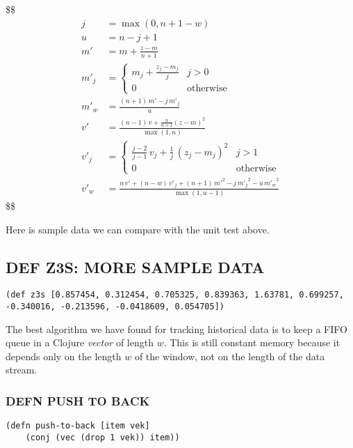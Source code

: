 \documentclass[10pt,oneside,x11names]{article}
\begin{document}
\$\$
\begin{align}
j     &= \max(0,n+1-w)               \\
u     &= n-j+1                       \\
m'    &= m+\frac{z-m}{n+1}           \\
m'_j  &= \begin{cases}
  m_j+\frac{z_j-m_j}{j} & j>0        \\
  0 & \mathrm{otherwise}
\end{cases}                          \\
m'_w  &= \frac{(n+1)\,m'-j\,m'_j}{u} \\
v'    &= \frac{(n-1)\,v+\frac{n}{n+1}\left(z-m\right)^2}{\max(1,n)}   \\
v'_j  &= \begin{cases}
  \frac{j-2}{j-1}\,v_j+\frac{1}{j}\,\left(z_j-m_j\right)^2 & j>1      \\
  0 & \mathrm{otherwise}
\end{cases}                                                           \\
v'_w  &= \frac{n\,v'+(n-w)\,v'_j+(n+1)\,{m'}^2-j\,{m'_j}^2-u\,{m'_w}^2}{\max(1,u-1)}
\end{align}
\$\$

Here is sample data we can compare with the unit test above.

\subsection{DEF Z3S: MORE SAMPLE DATA}
\label{sec:orgbf3f789}
\begin{verbatim}
(def z3s [0.857454, 0.312454, 0.705325, 0.839363, 1.63781, 0.699257, -0.340016, -0.213596, -0.0418609, 0.054705])
\end{verbatim}

The best algorithm we have found for tracking historical data is to keep
a FIFO queue in a Clojure \emph{vector} of length \(w\). This is still constant
memory because it depends only on the length \(w\) of the window, not on
the length of the data stream.

\subsubsection{DEFN PUSH TO BACK}
\label{sec:org4368c52}

\begin{verbatim}
(defn push-to-back [item vek]
    (conj (vec (drop 1 vek)) item))
\end{verbatim}
\end{document}
